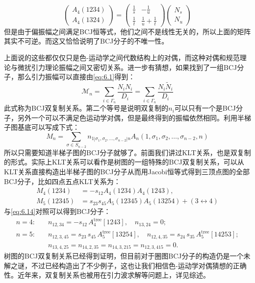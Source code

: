 \begin{equation}
	\begin{pmatrix}A_4(1234)\\A_4(1324)\end{pmatrix}=\begin{pmatrix}\frac{1}{s}&-\frac{1}{u}\\\frac{1}{t}&\frac{1}{u}+\frac{1}{t}\end{pmatrix}\begin{pmatrix}N_s\\N_u\end{pmatrix}
\end{equation}
但是由于偏振幅之间满足BCJ恒等式，他们之间不是线性无关的，所以上面的矩阵其实不可逆。而这又恰恰说明了BCJ分子的不唯一性。

上面说的这些都仅仅只是色-运动学之间代数结构上的对偶，而这种对偶和规范理论与微扰引力理论振幅之间又密切关系。进一步有猜想，如果找到了一组BCJ分子，那么引力振幅可以直接由\ref{eq:6.1}得到：
\begin{equation}
	\mathcal{M}_n=\sum_{i\in\Gamma_n}\frac{N_iN_i}{D_i}=\sum_{i\in\Gamma_n}\frac{N_i\tilde{N}_i}{D_i}
\end{equation}
此式称为BCJ双复制关系。第二个等号是说明双复制的$n_i$可以只有一个是BCJ分子，另外一个可以不满足色运动学对偶，但是最终得到的振幅依然相同。利用半梯子图基底可以写成下式：
\begin{equation}
	\label{eq:6.14}
	M_n=\sum_{\sigma\in S_{n-2}}n_{1|\sigma_1,\sigma_2,\ldots,\sigma_{n-2}|n}A_n(1,\sigma_1,\sigma_2,\ldots,\sigma_{n-2},n)
\end{equation}
所以只需要知道半梯子图的BCJ分子就够了。前面我们讲过KLT关系，也是双复制的形式。实际上KLT关系可以看作是树图的一组特殊的BCJ双复制关系，可以从KLT关系直接构造出半梯子图的BCJ分子从而用Jacobi恒等式得到三顶点图的全部BCJ分子，比如四点五点KLT关系为：
\begin{equation}
\begin{aligned}
	M_4(1234)&=-s_{12}A_4(1234)A_4(1243),\\M_5(12345)&=s_{23}s_{45}A_5(12345)A_5(13254)+(3\leftrightarrow4)
\end{aligned}
\end{equation}
与\ref{eq:6.14}对照可以得到BCJ分子：
\begin{equation}
	\begin{aligned}
		n=4:\quad & n_{12,34} = -s_{12}\,A^{\text{tree}}_{4}[1243], \quad n_{13,24} = 0; \\
		n=5:\quad & n_{12,3,45} = s_{23}\,s_{45}\,A^{\text{tree}}_{5}[13254], \quad n_{12,4,35} = s_{24}\,s_{35}\,A^{\text{tree}}_{5}[14253]; \\
		& n_{13,4,25} = n_{14,2,35} = n_{14,3,215} = n_{12,3,415} = 0.
	\end{aligned}
\end{equation}
树图的BCJ双复制关系已经得到证明\cite{Bern:2010yg}，但目前对于圈图BCJ分子的构造仍是一个未解之谜，不过已经构造出了不少例子\cite{Bern:2010ue,Bern:2012uf}，这也让我们相信色-运动学对偶猜想的正确性。近年来，双复制关系也被用在引力波求解等问题上，详见综述\cite{Bern:2019prr,Adamo:2022dcm,Bern:2022wqg}。

